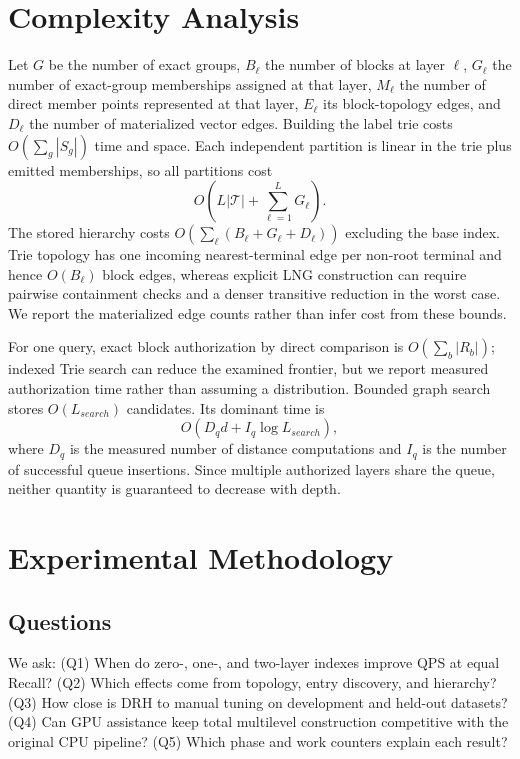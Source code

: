 \documentclass[sigconf,review,anonymous]{acmart}
\begin{document}
\section{Complexity Analysis}
Let $G$ be the number of exact groups, $B_\ell$ the number of blocks at layer
$\ell$, $G_\ell$ the number of exact-group memberships assigned at that layer,
$M_\ell$ the number of direct member points represented at that layer,
$E_\ell$ its block-topology edges, and $D_\ell$ the number of materialized
vector edges.  Building the label trie costs $O(\sum_g |S_g|)$ time and space.
Each independent partition is linear in the trie plus emitted memberships, so
all partitions cost
\begin{equation}
  O\left(L|\mathcal{T}|+\sum_{\ell=1}^{L}G_\ell\right).
\end{equation}
The stored hierarchy costs $O(\sum_\ell(B_\ell+G_\ell+D_\ell))$ excluding the
base index.  Trie topology has one incoming nearest-terminal edge per
non-root terminal and hence $O(B_\ell)$ block edges, whereas explicit LNG
construction can require pairwise containment checks and a denser transitive
reduction in the worst case.  We report the materialized edge counts rather
than infer cost from these bounds.

For one query, exact block authorization by direct comparison is
$O(\sum_b |R_b|)$; indexed Trie search can reduce the examined frontier, but we
report measured authorization time rather than assuming a distribution.
Bounded graph search stores $O(L_{search})$ candidates.  Its dominant time is
\begin{equation}
  O\left(D_q d + I_q\log L_{search}\right),
\end{equation}
where $D_q$ is the measured number of distance computations and $I_q$ is the
number of successful queue insertions.  Since multiple authorized layers share
the queue, neither quantity is guaranteed to decrease with depth.

\section{Experimental Methodology}
\subsection{Questions}
We ask: (Q1) When do zero-, one-, and two-layer indexes improve QPS at equal
Recall? (Q2) Which effects come from topology, entry discovery, and hierarchy?
(Q3) How close is DRH to manual tuning on development and held-out datasets?
(Q4) Can GPU assistance keep total multilevel construction competitive with the
original CPU pipeline? (Q5) Which phase and work counters explain each result?
\end{document}
